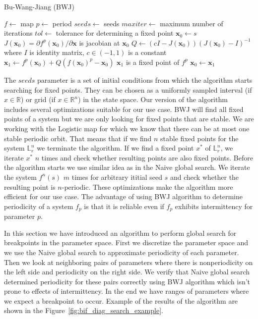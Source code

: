 \begin{algorithm}[!h]
    \caption{Bu-Wang-Jiang (BWJ)}
    \label{alg:bwj}
    \begin{algorithmic}[1]
        \Statex $f \gets$ map
        \Statex $p \gets$ period
        \Statex $seeds \gets$ seeds
        \Statex $maxiter \gets$ maximum number of iterations
        \Statex $tol \gets$ tolerance for determining a fixed point
            \State $\textbf{x}_{0} \gets s$
                \State $J(\textbf{x}_{0}) = \partial f^{p}(\textbf{x}_{0}) / \partial \textbf{x}$ is jacobian at $\textbf{x}_{0}$
                \State $Q \gets (cI-J(\textbf{x}_{0}))(J(\textbf{x}_{0})-I)^{-1}$ where $I$ is identity matrix, $c \in (-1, 1)$ is a constant 
                \State $\textbf{x}_1 \gets f^{p}(\textbf{x}_{0}) + Q(f(\textbf{x}_{0})^{p}-\textbf{x}_{0})$
                    \State $\textbf{x}_{1}$ is a fixed point of $f^{p}$
                \EndIf
                \State $\textbf{x}_{0} \gets \textbf{x}_{1}$
            \EndWhile
        \EndFor
    \end{algorithmic}
\end{algorithm}

The $seeds$ parameter is a set of initial conditions from which the algorithm starts searching for fixed points.
They can be chosen as a uniformly sampled interval (if $x \in \mathbb{R}$) or grid (if $x \in \mathbb{R}^{n}$) in the state space.
Our version of the algorithm includes several optimizations suitable for our use case.
BWJ will find all fixed points of a system but we are only looking for fixed points that are stable.
We are working with the Logistic map for which we know that there can be at most one stable periodic orbit.
That means that if we find $n$ stable fixed points for the system $\mathbb{L}_{r}^{n}$ we terminate the algorithm.
If we find a fixed point $x^{*}$ of $\mathbb{L}_{r}^{n}$, we iterate $x^{*}$ $n$ times and check whether resulting points are also fixed points.
Before the algorithm starts we use similar idea as in the Naive global search. We iterate the system $f^{n}(s)$ $m$ times for arbitrary ititial seed $s$ and check whether the resulting point is $n$-periodic.
These optimizations make the algorithm more efficient for our use case.
The advantage of using BWJ algorithm to determine periodicity of a system $f_{p}$ is that it is reliable even if $f_{p}$ exhibits intermittency for parameter $p$.
\par
In this section we have introduced an algorithm to perform global search for breakpoints in the parameter space.
First we discretize the parameter space and we use the Naive global search to approximate periodicity of each parameter.
Then we look at neighboring pairs of parameters where there is nonperiodicity on the left side and periodicity on the right side.
We verify that Naive global search determined periodicity for these pairs correctly using BWJ algorithm which isn't prone to effects of intermittency.
In the end we have ranges of parameters where we expect a breakpoint to occur.
Example of the results of the algorithm are shown in the Figure~\ref{fig:bif_diag_search_example}.

